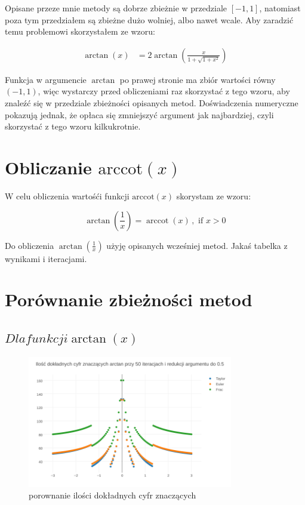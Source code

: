 \documentclass{article}
\begin{document}
Opisane przeze mnie metody są dobrze zbieżnie w przedziale $[-1,1]$, natomiast poza tym przedziałem są zbieżne dużo wolniej, albo nawet wcale.
Aby zaradzić temu problemowi skorzystałem ze wzoru:

\begin{equation}
	{\begin{aligned}\arctan(x)&=2\arctan \left({\frac {x}{1+{\sqrt {1+x^{2}}}}}\right)\end{aligned}}
\end{equation}

Funkcja w argumencie $\arctan$ po prawej stronie ma zbiór wartości równy $(-1,1)$, więc wystarczy przed obliczeniami raz skorzystać z tego wzoru, aby znaleźć się w przedziale zbieżności opisanych metod.
Doświadczenia numeryczne pokazują jednak, że opłaca się zmniejszyć argument jak najbardziej, czyli skorzystać z tego wzoru kilkukrotnie.

\section{Obliczanie $\textrm{arccot}(x)$}
W celu obliczenia wartośći funkcji $\textrm{arccot}(x)$ skorystam ze wzoru:

\begin{equation}
\arctan \left({\frac {1}{x}}\right)=\operatorname {arccot}(x)\,,{\text{ if }}x>0
\end{equation}

Do obliczenia $\arctan(\frac{1}{x})$ użyję opisanych wcześniej metod.
Jakaś tabelka z wynikami i iteracjami.

\clearpage
\section{Porównanie zbieżności metod}
\subsection{$Dla funkcji \arctan(x)$}

	\begin{figure}[h]
		\includegraphics[width=0.8\textwidth,scale=0.5]{atan_znaczace.png}
		\caption{porownanie ilości dokładnych cyfr znaczących}
		\label{wskaźnik uwarunkowania}
	\end{figure}
\FloatBarrier
\end{document}
